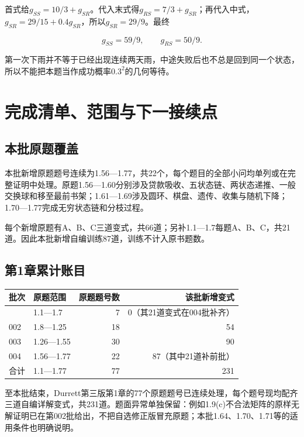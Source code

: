 \documentclass[
  11pt,a4paper,UTF8,fontset=fandol]{ctexart}
\begin{document}
首式给\(g_{SS}=10/3+g_{SR}\)。代入末式得\(g_{RS}=7/3+g_{SR}\)；再代入中式，\(g_{SR}=29/15+0.4g_{SR}\)，所以\(g_{SR}=29/9\)。最终

\[\boxed{g_{SS}=59/9,\qquad g_{RS}=50/9.}\]

第一次下雨并不等于已经出现连续两天雨，中途失败后也不总是回到同一个状态，所以不能把本题当作成功概率\(0.3^2\)的几何等待。

\section{完成清单、范围与下一接续点}\label{ux5b8cux6210ux6e05ux5355ux8303ux56f4ux4e0eux4e0bux4e00ux63a5ux7eedux70b9}

\subsection{本批原题覆盖}\label{ux672cux6279ux539fux9898ux8986ux76d6}

本批新增原题题号连续为1.56---1.77，共22个，每个题目的全部小问均单列或在完整证明中处理。原题1.56---1.60分别涉及贷款吸收、五状态链、两状态递推、一般交换球和移至最前书架；1.61---1.69涉及圆环、棋盘、遗传、收集与随机下降；1.70---1.77完成无穷状态链和分枝过程。

每个新增原题有A、B、C三道变式，共66道；另补1.1---1.7每题A、B、C，共21道。因此本批新增自编训练87道，训练不计入原书题数。

\subsection{第1章累计账目}\label{ux7b2c1ux7ae0ux7d2fux8ba1ux8d26ux76ee}

\begin{longtable}[]{@{}llrr@{}}
\toprule\noalign{}
批次 & 原题范围 & 原题题号数 & 该批新增变式 \\
\midrule\noalign{}
\endhead
\bottomrule\noalign{}
\endlastfoot
001 & 1.1---1.7 & 7 & 0（其21道变式在004批补齐） \\
002 & 1.8---1.25 & 18 & 54 \\
003 & 1.26---1.55 & 30 & 90 \\
004 & 1.56---1.77 & 22 & 87（其中21道补前批） \\
合计 & 1.1---1.77 & 77 & 231 \\
\end{longtable}

至本批结束，Durrett第三版第1章的77个原题题号已连续处理，每个题号现均配齐三道自编详解变式，共231道。题面异常单独保留：例如1.9(c)不合法矩阵的原样无解证明已在第002批给出，不把自选修正版冒充原题；本批1.64、1.70、1.71等的适用条件也明确说明。
\end{document}
